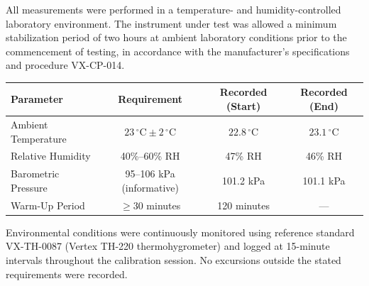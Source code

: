 
All measurements were performed in a temperature- and humidity-controlled laboratory
environment. The instrument under test was allowed a minimum stabilization period of
two hours at ambient laboratory conditions prior to the commencement of testing, in
accordance with the manufacturer's specifications and procedure VX-CP-014.

\vspace{4pt}
\begin{center}
\small
\begin{tabular}{@{}lccc@{}}
  \toprule
  Parameter & Requirement & Recorded (Start) & Recorded (End) \\
  \midrule
  Ambient Temperature & $23\,^{\circ}\mathrm{C} \pm 2\,^{\circ}\mathrm{C}$ & $22.8\,^{\circ}\mathrm{C}$ & $23.1\,^{\circ}\mathrm{C}$ \\
  Relative Humidity & 40\%--60\% RH & 47\% RH & 46\% RH \\
  Barometric Pressure & 95--106 kPa (informative) & 101.2 kPa & 101.1 kPa \\
  Warm-Up Period & $\geq 30$ minutes & 120 minutes & --- \\
  \bottomrule
\end{tabular}
\end{center}

\vspace{4pt}
{\small\color{certgray} Environmental conditions were continuously monitored using
reference standard VX-TH-0087 (Vertex TH-220 thermohygrometer) and logged at
15-minute intervals throughout the calibration session. No excursions outside the
stated requirements were recorded.}
